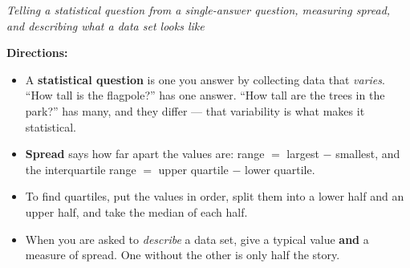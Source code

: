 \documentclass[12pt]{article}
\begin{document}

\begin{center}
\textit{Telling a statistical question from a single-answer question, measuring
spread, and describing what a data set looks like}
\end{center}

\noindent\textbf{Directions:}
\begin{itemize}
  \item A \textbf{statistical question} is one you answer by collecting data
        that \emph{varies}. ``How tall is the flagpole?'' has one answer.
        ``How tall are the trees in the park?'' has many, and they differ ---
        that variability is what makes it statistical.
  \item \textbf{Spread} says how far apart the values are:
        range $=$ largest $-$ smallest, and the interquartile range
        $=$ upper quartile $-$ lower quartile.
  \item To find quartiles, put the values in order, split them into a lower half
        and an upper half, and take the median of each half.
  \item When you are asked to \emph{describe} a data set, give a typical value
        \textbf{and} a measure of spread. One without the other is only half the
        story.
\end{itemize}


\end{document}
